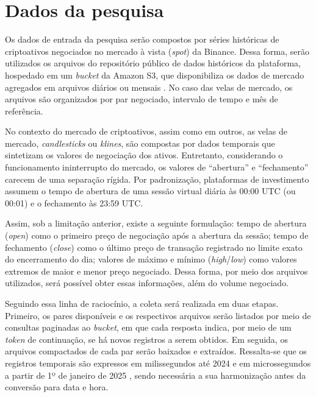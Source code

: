 \section{Dados da pesquisa}
\label{sec_dados_da_pesquisa}

Os dados de entrada da pesquisa serão compostos por séries históricas de criptoativos negociados no mercado à vista (\textit{spot}) da Binance. Dessa forma, serão utilizados os arquivos do repositório público de dados históricos da plataforma, hospedado em um \textit{bucket} da Amazon S3, que disponibiliza os dados de mercado agregados em arquivos diários ou mensais \cite{binancepublicdata}. No caso das velas de mercado, os arquivos são organizados por par negociado, intervalo de tempo e mês de referência.

No contexto do mercado de criptoativos, assim como em outros, as velas de mercado, \textit{candlesticks} ou \textit{klines}, são compostas por dados temporais que sintetizam os valores de negociação dos ativos. Entretanto, considerando o funcionamento ininterrupto do mercado, os valores de ``abertura'' e ``fechamento'' carecem de uma separação rígida. Por padronização, plataformas de investimento assumem o tempo de abertura de uma sessão virtual diária às 00:00 UTC (ou 00:01) e o fechamento às 23:59 UTC.

Assim, sob a limitação anterior, existe a seguinte formulação: tempo de abertura (\textit{open}) como o primeiro preço de negociação após a abertura da sessão; tempo de fechamento (\textit{close}) como o último preço de transação registrado no limite exato do encerramento do dia; valores de máximo e mínimo (\textit{high}/\textit{low}) como valores extremos de maior e menor preço negociado. Dessa forma, por meio dos arquivos utilizados, será possível obter essas informações, além do volume negociado.

Seguindo essa linha de raciocínio, a coleta será realizada em duas etapas. Primeiro, os pares disponíveis e os respectivos arquivos serão listados por meio de consultas paginadas ao \textit{bucket}, em que cada resposta indica, por meio de um \textit{token} de continuação, se há novos registros a serem obtidos. Em seguida, os arquivos compactados de cada par serão baixados e extraídos. Ressalta-se que os registros temporais são expressos em milissegundos até 2024 e em microssegundos a partir de 1º de janeiro de 2025 \cite{binancepublicdata}, sendo necessária a sua harmonização antes da conversão para data e hora.

